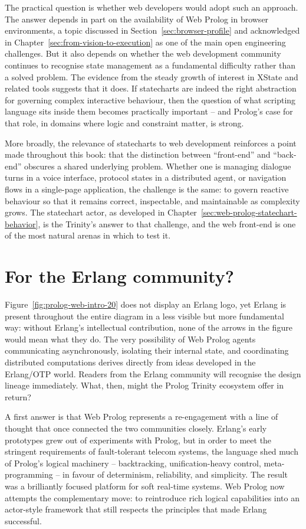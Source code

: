 The practical question is whether web developers would adopt such an approach. The answer depends in part on the availability of Web Prolog in browser environments, a topic discussed in Section~\ref{sec:browser-profile} and acknowledged in Chapter~\ref{sec:from-vision-to-execution} as one of the main open engineering challenges. But it also depends on whether the web development community continues to recognise state management as a fundamental difficulty rather than a solved problem. The evidence from the steady growth of interest in XState and related tools suggests that it does. If statecharts are indeed the right abstraction for governing complex interactive behaviour, then the question of what scripting language sits inside them becomes practically important -- and Prolog's case for that role, in domains where logic and constraint matter, is strong.

More broadly, the relevance of statecharts to web development reinforces a point made throughout this book: that the distinction between ``front-end'' and ``back-end'' obscures a shared underlying problem. Whether one is managing dialogue turns in a voice interface, protocol states in a distributed agent, or navigation flows in a single-page application, the challenge is the same: to govern reactive behaviour so that it remains correct, inspectable, and maintainable as complexity grows. The statechart actor, as developed in Chapter~\ref{sec:web-prolog-statechart-behavior}, is the Trinity's answer to that challenge, and the web front-end is one of the most natural arenas in which to test it.

\section{For the Erlang community?}\label{sec:erlang-community}

Figure~\ref{fig:prolog-web-intro-20} does not display an Erlang logo, yet Erlang is present throughout the entire diagram in a less visible but more fundamental way: without Erlang's intellectual contribution, none of the arrows in the figure would mean what they do. The very possibility of Web Prolog agents communicating asynchronously, isolating their internal state, and coordinating distributed computations derives directly from ideas developed in the Erlang/OTP world. Readers from the Erlang community will recognise the design lineage immediately. What, then, might the Prolog Trinity ecosystem offer in return?

A first answer is that Web Prolog represents a re-engagement with a line of thought that once connected the two communities closely. Erlang's early prototypes grew out of experiments with Prolog, but in order to meet the stringent requirements of fault-tolerant telecom systems, the language shed much of Prolog's logical machinery -- backtracking, unification-heavy control, meta-programming -- in favour of determinism, reliability, and simplicity. The result was a brilliantly focused platform for soft real-time systems. Web Prolog now attempts the complementary move: to reintroduce rich logical capabilities into an actor-style framework that still respects the principles that made Erlang successful.


